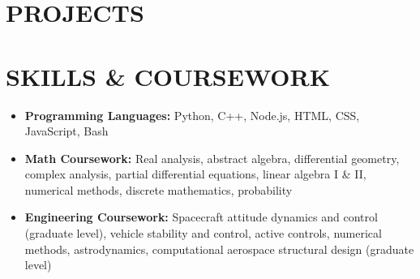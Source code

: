 \documentclass[a4paper,9pt]{extarticle}
\begin{document}
\section*{PROJECTS}

\Meatball
\InvertedPendulum


\newcommand{\EngineeringSkills}{
\section*{SKILLS \& COURSEWORK}
\begin{itemize}
    \item \textbf{Programming Languages:} Python, C++, Node.js, HTML, CSS, JavaScript, Bash
    \item \textbf{Math Coursework:} Real analysis, abstract algebra, differential geometry, complex analysis, partial differential equations, linear algebra I \& II, numerical methods, discrete mathematics, probability
    \item \textbf{Engineering Coursework:} Spacecraft attitude dynamics and control (graduate level), vehicle stability and control, active controls, numerical methods, astrodynamics, computational aerospace structural design (graduate level)
\end{itemize}
}

\newcommand{\FFCertifications}{
\section*{Certifications}
\begin{itemize}
    \item NFPA 1001: Structural Firefighter 1 and 2 — IFSAC Certified
    \item NFPA 1072: HAZMAT Awareness and Operations — IFSAC Certified
    \item EMT-Basic — California EMT and NREMT
\end{itemize}
}


\EngineeringSkills
\end{document}
